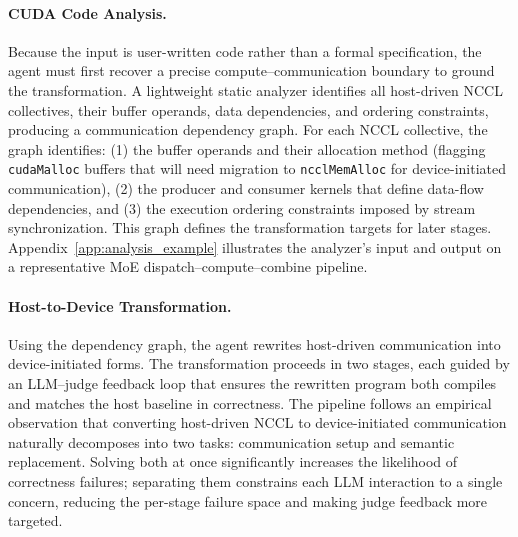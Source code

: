 \paragraph{CUDA Code Analysis.}
Because the input is user-written code rather than a formal specification, the agent must first recover a precise compute--communication boundary to ground the transformation. A lightweight static analyzer identifies all host-driven NCCL collectives, their buffer operands, data dependencies, and ordering constraints, producing a communication dependency graph. For each NCCL collective, the graph identifies: (1) the buffer operands and their allocation method (flagging \texttt{cudaMalloc} buffers that will need migration to \texttt{ncclMemAlloc} for device-initiated communication), (2) the producer and consumer kernels that define data-flow dependencies, and (3) the execution ordering constraints imposed by stream synchronization. This graph defines the transformation targets for later stages. Appendix~\ref{app:analysis_example} illustrates the analyzer's input and output on a representative MoE dispatch--compute--combine pipeline.

\paragraph{Host-to-Device Transformation.}
Using the dependency graph, the agent rewrites host-driven communication into device-initiated forms. The transformation proceeds in two stages, each guided by an LLM--judge feedback loop that ensures the rewritten program both compiles and matches the host baseline in correctness. The pipeline follows an empirical observation that converting host-driven NCCL to device-initiated communication naturally decomposes into two tasks: communication setup and semantic replacement. Solving both at once significantly increases the likelihood of correctness failures; separating them constrains each LLM interaction to a single concern, reducing the per-stage failure space and making judge feedback more targeted.

